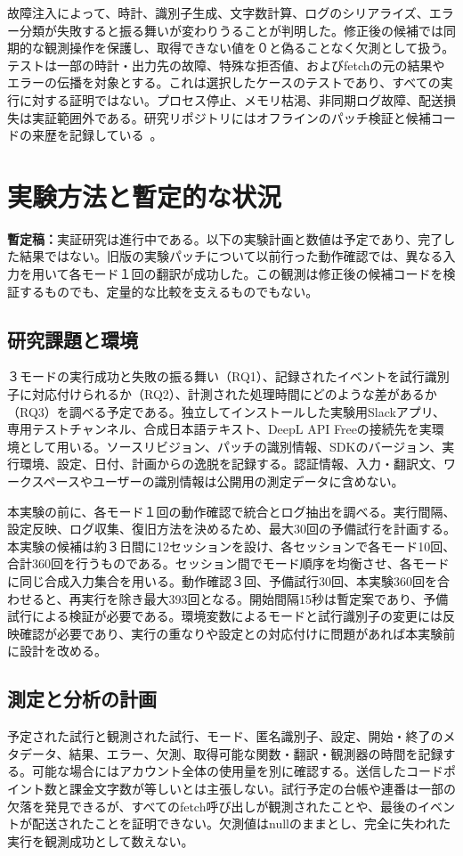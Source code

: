\documentclass[10pt,twocolumn]{ltjsarticle}
\begin{document}
故障注入によって、時計、識別子生成、文字数計算、ログのシリアライズ、エラー分類が失敗すると振る舞いが変わりうることが判明した。修正後の候補では同期的な観測操作を保護し、取得できない値を０と偽ることなく欠測として扱う。テストは一部の時計・出力先の故障、特殊な拒否値、およびfetchの元の結果やエラーの伝播を対象とする。これは選択したケースのテストであり、すべての実行に対する証明ではない。プロセス停止、メモリ枯渇、非同期ログ故障、配送損失は実証範囲外である。研究リポジトリにはオフラインのパッチ検証と候補コードの来歴を記録している~\cite{repository}。

\section{実験方法と暫定的な状況}\label{sec:experiment}
\textbf{暫定稿：}実証研究は進行中である。以下の実験計画と数値は予定であり、完了した結果ではない。旧版の実験パッチについて以前行った動作確認では、異なる入力を用いて各モード１回の翻訳が成功した。この観測は修正後の候補コードを検証するものでも、定量的な比較を支えるものでもない。

\subsection{研究課題と環境}
３モードの実行成功と失敗の振る舞い（RQ1）、記録されたイベントを試行識別子に対応付けられるか（RQ2）、計測された処理時間にどのような差があるか（RQ3）を調べる予定である。独立してインストールした実験用Slackアプリ、専用テストチャンネル、合成日本語テキスト、DeepL API Freeの接続先を実環境として用いる。ソースリビジョン、パッチの識別情報、SDKのバージョン、実行環境、設定、日付、計画からの逸脱を記録する。認証情報、入力・翻訳文、ワークスペースやユーザーの識別情報は公開用の測定データに含めない。

本実験の前に、各モード１回の動作確認で統合とログ抽出を調べる。実行間隔、設定反映、ログ収集、復旧方法を決めるため、最大30回の予備試行を計画する。本実験の候補は約３日間に12セッションを設け、各セッションで各モード10回、合計360回を行うものである。セッション間でモード順序を均衡させ、各モードに同じ合成入力集合を用いる。動作確認３回、予備試行30回、本実験360回を合わせると、再実行を除き最大393回となる。開始間隔15秒は暫定案であり、予備試行による検証が必要である。環境変数によるモードと試行識別子の変更には反映確認が必要であり、実行の重なりや設定との対応付けに問題があれば本実験前に設計を改める。

\subsection{測定と分析の計画}
予定された試行と観測された試行、モード、匿名識別子、設定、開始・終了のメタデータ、結果、エラー、欠測、取得可能な関数・翻訳・観測器の時間を記録する。可能な場合にはアカウント全体の使用量を別に確認する。送信したコードポイント数と課金文字数が等しいとは主張しない。試行予定の台帳や連番は一部の欠落を発見できるが、すべてのfetch呼び出しが観測されたことや、最後のイベントが配送されたことを証明できない。欠測値はnullのままとし、完全に失われた実行を観測成功として数えない。
\end{document}
